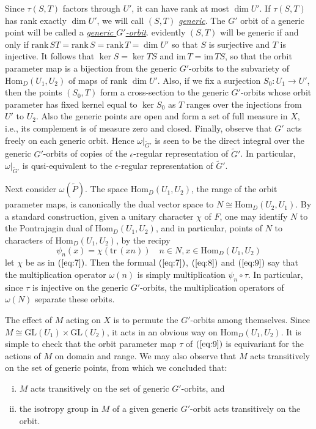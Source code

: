 \documentclass[12pt]{amsart}
\def\emp#1{\underline{\em #1}}
\def\GL{{\mathrm{GL}}}
\def\Hom{{\mathrm{Hom}}}
\def\im{{\mathrm{im\,}}}
\def\tP{{\widetilde{P}}}
\def\tG{{\widetilde{G}}}
\def\tr{{\mathrm{tr\,}}}
\def\rank{{\mathrm{rank\,}}}
\begin{document}
Since $\tau(S,T)$ factors through $U'$, it can have rank at most
$\dim U'$. If $\tau(S,T)$ has rank exactly $\dim U'$, we will call 
$(S,T)$ \emp{generic}. The $G'$ orbit of a generic point
will be called a \emp{generic $G'$-orbit}.
evidently $(S,T)$ will be generic if and only if $\rank 
ST=\rank S = \rank T =\dim U'$ so that $S$ is surjective and $T$ 
is injective. It follows that $\ker S = \ker TS$ and $\im T=\im TS$, 
so that the orbit parameter map is a bijection from the generic $G'$-orbits
to the subvariety of $\Hom_D(U_1,U_2)$ of maps of rank $\dim U'$. 
Also, if we fix a surjection $S_0:U_1\to U'$, then 
the points $(S_0,T)$ form a cross-section to the generic $G'$-orbits 
whose orbit parameter has fixed kernel equal to $\ker S_0$ as
$T$ ranges over the injections from $U'$ to $U_2$. Also the generic points
are open and form a set of full measure in $X$, 
i.e., its complement is of measure zero and closed. 
Finally, observe that $G'$ acts freely on 
each generic orbit. Hence $\omega|_{\tG'}$ is seen to be 
the direct integral over the generic $G'$-orbits of copies of 
the $\epsilon$-regular representation of $\tG'$.
In particular, $\omega|_{\tG'}$ is qusi-equivalent to the $\epsilon$-regular
representation of $\tG'$. 

Next consider $\omega(\tP)$. The space $\Hom_D(U_1,U_2)$, the range of
the orbit parameter maps, is canonically the dual vector space
to $N\cong \Hom_D(U_2,U_1)$. 
By a standard construction, given a unitary character $\chi$ of $F$,
one may identify $N$ to the Pontrajagin dual of $\Hom_D(U_1,U_2)$, 
and in particular, points of $N$ to characters of $\Hom_D(U_1,U_2)$, 
by the recipy
\begin{equation}\label{eq:10}
\psi_n(x) = \chi(\tr(xn)) \quad n\in N, x\in \Hom_D(U_1,U_2)
\end{equation}
let $\chi$ be as in $(\ref{eq:7})$. Then the formual $(\ref{eq:7})$,
$(\ref{eq:8})$ and $(\ref{eq:9})$ say that the multiplication operator 
$\omega(n)$ is simply multiplication $\psi_n\circ \tau$.
In particular, since $\tau$ is injective on the generic $G'$-orbits, 
the multiplication operators of $\omega(N)$ separate these orbits.

The effect of $M$ acting on $X$ is to permute the $G'$-orbits
among themselves. 
Since $M\cong \GL(U_1)\times \GL(U_2)$, it acts in an obvious way on 
$\Hom_D(U_1,U_2)$. It is simple to check that 
the orbit parameter map $\tau$ of $(\ref{eq:9})$ is equivariant 
for the actions of $M$ on domain and range. 
We may also observe that $M$ acts transitively on the set of generic points, 
from which we concluded that:
\begin{enumerate}[i)]
\item $M$ acts transitively on the set of generic $G'$-orbits, and
\item the isotropy group in $M$ of a given generic $G'$-orbit acts 
transitively on the orbit.
\end{enumerate}
\end{document}

